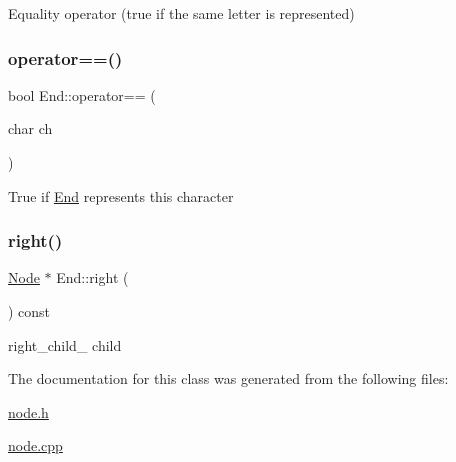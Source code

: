 Equality operator (true if the same letter is represented) \mbox{\label{class_end_a0b3d32d1f08031447f6facf17ee17dff}} 
\subsubsection{\texorpdfstring{operator==()}{operator==()}\hspace{0.1cm}{\footnotesize\ttfamily [2/2]}}
{\footnotesize\ttfamily bool End\+::operator== (\begin{DoxyParamCaption}\item[{char}]{ch }\end{DoxyParamCaption})}

True if \hyperlink{class_end}{End} represents this character \mbox{\label{class_end_ac8e651d50ce2b99256be11aa9b89ded4}} 
\subsubsection{\texorpdfstring{right()}{right()}}
{\footnotesize\ttfamily \hyperlink{class_node}{Node} $\ast$ End\+::right (\begin{DoxyParamCaption}{ }\end{DoxyParamCaption}) const}

right\+\_\+child\+\_\+ child 

The documentation for this class was generated from the following files\+:\begin{DoxyCompactItemize}
\item 
\hyperlink{node_8h}{node.\+h}\item 
\hyperlink{node_8cpp}{node.\+cpp}\end{DoxyCompactItemize}
